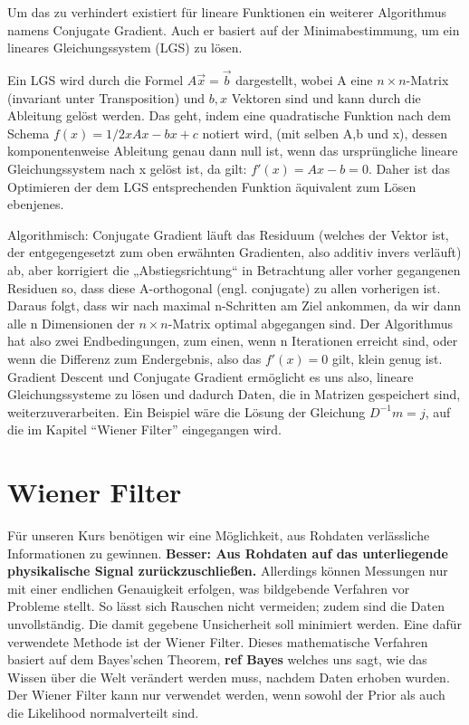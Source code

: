 \documentclass[]{dsadokumentation}
\newcommand\comment[1]{{\color{red} \textbf{#1}}}
\begin{document}
Um das zu verhindert existiert für lineare Funktionen ein weiterer Algorithmus namens Conjugate Gradient. Auch er basiert auf der Minimabestimmung, um ein lineares Gleichungssystem (LGS) zu lösen.

Ein LGS wird durch die Formel $A\vec{x} = \vec{b}$ dargestellt, wobei A eine $ n \times n $-Matrix (invariant unter Transposition) und $ b,x $ Vektoren sind und kann durch die Ableitung gelöst werden. Das geht, indem eine quadratische Funktion nach dem Schema $ f(x) = 1/2xAx-bx+c $ notiert wird, (mit selben A,b und x), dessen komponentenweise Ableitung genau dann null ist, wenn das ursprüngliche lineare Gleichungssystem nach x gelöst ist, da gilt: $f'(x) = Ax-b = 0$. Daher ist das Optimieren der dem LGS entsprechenden Funktion äquivalent zum Lösen ebenjenes.

Algorithmisch: Conjugate Gradient läuft das Residuum (welches der Vektor ist, der entgegengesetzt zum oben erwähnten Gradienten, also additiv invers verläuft) ab, aber korrigiert die „Abstiegsrichtung“ in Betrachtung aller vorher gegangenen Residuen so, dass diese A-orthogonal (engl. conjugate) zu allen vorherigen ist. Daraus folgt, dass wir nach maximal n-Schritten am Ziel ankommen, da wir dann alle n Dimensionen der $ n \times n $-Matrix optimal abgegangen sind. Der Algorithmus hat also zwei Endbedingungen, zum einen, wenn n Iterationen erreicht sind, oder wenn die Differenz zum Endergebnis, also das $ f'(x) = 0 $ gilt, klein genug ist.
Gradient Descent und Conjugate Gradient ermöglicht es uns also, lineare Gleichungssysteme zu lösen und dadurch Daten, die in Matrizen gespeichert sind, weiterzuverarbeiten. Ein Beispiel wäre die Lösung der Gleichung  $ D^{-1} m = j $, auf die im Kapitel \enquote{Wiener Filter} eingegangen wird.

\section{Wiener Filter}

Für unseren Kurs benötigen wir eine Möglichkeit, aus Rohdaten verlässliche Informationen zu gewinnen. \comment{Besser: Aus Rohdaten auf das unterliegende physikalische Signal zurückzuschließen.}
Allerdings können Messungen nur mit einer endlichen Genauigkeit erfolgen, was bildgebende Verfahren vor Probleme stellt.
So lässt sich Rauschen nicht vermeiden; zudem sind die Daten unvollständig.
Die damit gegebene Unsicherheit soll minimiert werden.
Eine dafür verwendete Methode ist der Wiener Filter.
Dieses mathematische Verfahren basiert auf dem Bayes'schen Theorem, \comment{ref Bayes} welches uns sagt, wie das Wissen über die Welt verändert werden muss, nachdem Daten erhoben wurden.
Der Wiener Filter kann nur verwendet werden, wenn sowohl der Prior als auch die Likelihood normalverteilt sind.
\end{document}
